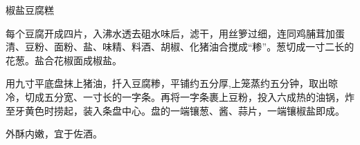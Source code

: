 \begin{recipe}{椒盐豆腐糕}

\ingredients


\cooking

\step 每个豆腐开成四片，入沸水透去砠水味后，滤干，用丝箩过细，连同鸡脯茸加蛋清、豆粉、面粉、盐、味精、料酒、胡椒、化猪油合搅成“糁”。葱切成一寸二长的花葱。盐合花椒面成椒盐。

\step 用九寸平底盘抹上猪油，扦入豆腐糁，平铺约五分厚,上笼蒸约五分钟，取出晾冷，切成五分宽、一寸长的一字条。再将一字条裹上豆粉，投入六成热的油锅，炸至牙黄色时捞起，装入条盘中心。盘的一端镶葱、酱、蒜片，一端镶椒盐即成。

\notes

外酥内嫩，宜于佐酒。

\end{recipe}


